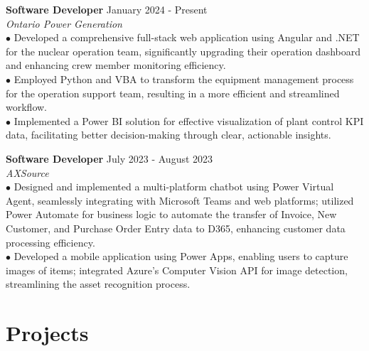 \documentclass[letterpaper,12pt]{article}
\begin{document}
\textbf{Software Developer} \hfill January 2024 - Present \\
\textit{Ontario Power Generation}
\vspace{0.25cm} \\
\hspace{0.1cm} $\bullet$ \hspace{0.21em}Developed a comprehensive full-stack web application using Angular and .NET for the nuclear operation team, significantly upgrading their operation dashboard and enhancing crew member monitoring efficiency.\\ 
\hspace{0.1cm} $\bullet$ \hspace{0.35em}Employed Python and VBA to transform the equipment management process for the operation support team, resulting in a more efficient and streamlined workflow.\\
\hspace{0.1cm} $\bullet$ \hspace{0.35em}Implemented a Power BI solution for effective visualization of plant control KPI data, facilitating better decision-making through clear, actionable insights.

\textbf{Software Developer}  \hfill   July 2023 - August 2023 \\
\textit{AXSource} 
\vspace{0.3cm}  
\\\hspace{0.1cm} $\bullet$ \hspace{0.3em}Designed and implemented a multi-platform chatbot using Power Virtual Agent, seamlessly integrating with Microsoft Teams and web platforms; utilized Power Automate for business logic to automate the transfer of Invoice, New Customer, and Purchase Order Entry data to D365, enhancing customer data processing efficiency.\\
\hspace{0.1cm} $\bullet$ \hspace{0.35em}Developed a mobile application using Power Apps, enabling users to capture images of items; integrated Azure's Computer Vision API for image detection, streamlining the asset recognition process. 
\section{Projects}
\end{document}
